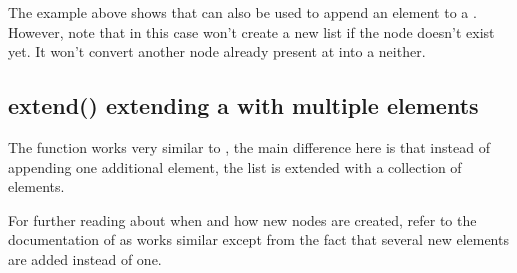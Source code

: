 \documentclass[a4paper,10pt,english]{sphinxmanual}
\begin{document}
\sphinxAtStartPar
The example above shows that  can also be used to append an element to a . However, note that  in this case won’t create a new list if the node doesn’t exist yet. It won’t convert another node already present at  into a  neither.


\subsection{extend() \textendash{} extending a  with multiple elements}
\label{\detokenize{README:extend-extending-a-list-with-multiple-elements}}
\sphinxAtStartPar
The  function works very similar to {\hyperref[\detokenize{README:append-adding-a-new-element-to-a-list}]{}}, the main difference here is that instead of appending one additional element, the list is extended with a collection of elements.

\begin{sphinxVerbatim}[commandchars=\\\{\},numbers=left,firstnumber=1,stepnumber=1]
     
\end{sphinxVerbatim}

\sphinxAtStartPar
For further reading about when and how new \sphinxhyphen{}nodes are created, refer to the documentation of {\hyperref[\detokenize{README:append-adding-a-new-element-to-a-list}]{}} as  works similar except from the fact that several new elements are added instead of one.
\end{document}
